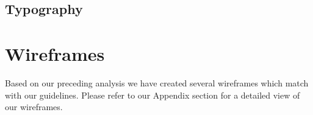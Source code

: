 \subsection{Typography}\label{subsec:typography}


\section{Wireframes}\label{sec:wireframes}

Based on our preceding analysis we have created several wireframes which match with our guidelines.
Please refer to our Appendix section for a detailed view of our wireframes. %
